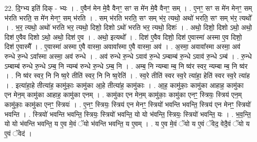 \documentclass[17pt]{extarticle}
\begin{document}
22. दि॒ग्भ्य इति॑ दिक् - भ्यः । . ए॒वैन॑ मेन मे॒वै वैनꣳ॒॒ सꣳ स मे॑न मे॒वै वैनꣳ॒॒ सम् । . ए॒नꣳ॒॒ सꣳ स मे॑न मेनꣳ॒॒ सम् भ॑रति भरति॒ स मे॑न मेनꣳ॒॒ सम् भ॑रति । . सम् भ॑रति भरति॒ सꣳ सम् भ॑र॒ त्यथो॒ अथो॑ भरति॒ सꣳ सम् भ॑र॒ त्यथो᳚ । . भ॒र॒ त्यथो॒ अथो॑ भरति भर॒ त्यथो॒ दिशो॒ दिशो ऽथो॑ भरति भर॒ त्यथो॒ दिशः॑ । . अथो॒ दिशो॒ दिशो ऽथो॒ अथो॒ दिश॑ ए॒वैव दिशो ऽथो॒ अथो॒ दिश॑ ए॒व । . अथो॒ इत्यथो᳚ । . दिश॑ ए॒वैव दिशो॒ दिश॑ ए॒वास्मा॑ अस्मा ए॒व दिशो॒ दिश॑ ए॒वास्मै᳚ । . ए॒वास्मा॑ अस्मा ए॒वै वास्मा॒ अवावा᳚स्मा ए॒वै वास्मा॒ अव॑ । . अ॒स्मा॒ अवावा᳚स्मा अस्मा॒ अव॑ रुन्धे रु॒न्धे ऽवा᳚स्मा अस्मा॒ अव॑ रुन्धे । . अव॑ रुन्धे रु॒न्धे ऽवाव॑ रु॒न्धे ऽम्बाम्ब॑ रु॒न्धे ऽवाव॑ रु॒न्धे ऽम्ब॑ । . रु॒न्धे ऽम्बाम्ब॑ रुन्धे रु॒न्धे ऽम्ब॒ नि न्यम्ब॑ रुन्धे रु॒न्धे ऽम्ब॒ नि । . अम्ब॒ नि न्यम्बा म्ब॒ नि ष्व॑र स्वर॒ न्यम्बा म्ब॒ नि ष्व॑र । . नि ष्व॑र स्वर॒ नि नि ष्व॒रे तीति॑ स्वर॒ नि नि ष्व॒रेति॑ । . स्व॒रे तीति॑ स्वर स्व॒रे त्या॑हा॒ हेति॑ स्वर स्व॒रे त्या॑ह । . इत्या॑हा॒हे तीत्या॑ह॒ कामु॑काः॒ कामु॑का आ॒हे तीत्या॑ह॒ कामु॑काः । . आ॒ह॒ कामु॑काः॒ कामु॑का आहाह॒ कामु॑का एन मेन॒म् कामु॑का आहाह॒ कामु॑का एनम् । . कामु॑का एन मेन॒म् कामु॑काः॒ कामु॑का एनꣳ॒॒ स्त्रियः॒ स्त्रिय॑ एन॒म् कामु॑काः॒ कामु॑का एनꣳ॒॒ स्त्रियः॑ । . ए॒नꣳ॒॒ स्त्रियः॒ स्त्रिय॑ एन मेनꣳ॒॒ स्त्रियो॑ भवन्ति भवन्ति॒ स्त्रिय॑ एन मेनꣳ॒॒ स्त्रियो॑ भवन्ति । . स्त्रियो॑ भवन्ति भवन्ति॒ स्त्रियः॒ स्त्रियो॑ भवन्ति॒ यो यो भ॑वन्ति॒ स्त्रियः॒ स्त्रियो॑ भवन्ति॒ यः । . भ॒व॒न्ति॒ यो यो भ॑वन्ति भवन्ति॒ य ए॒व मे॒वं ॅयो भ॑वन्ति भवन्ति॒ य ए॒वम् । . य ए॒व मे॒वं ॅयो य ए॒वं ॅवेद॒ वेदै॒वं ॅयो य ए॒वं ॅवेद॑ । \newline
\end{document}
